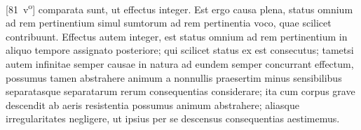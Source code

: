 \hspace*{-1.4mm}[81~v\textsuperscript{o}] comparata sunt, ut  effectus integer. Est ergo causa plena, status omnium ad rem pertinentium simul sumtorum ad rem pertinentia voco, quae scilicet  contribuunt. Effectus autem integer, est status omnium ad rem pertinentium in aliquo tempore assignato posteriore; qui scilicet status ex  est consecutus; tametsi autem infinitae semper causae in natura ad eundem semper concurrant effectum, possumus tamen abstrahere animum a nonnullis praesertim minus sensibilibus separatasque separatarum rerum consequentias considerare; ita cum corpus grave descendit ab aeris resistentia\protect{} possumus animum abstrahere; aliasque irregularitates negligere, ut ipsius per se descensus consequentias aestimemus. 
\pend 
\count{}
\count{}
\pstart 
